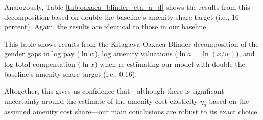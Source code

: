 Analogously, Table \ref{tab:oaxaca_blinder_eta_a_d} shows the results from this decomposition based on double the baseline's amenity share target (i.e., $16$ percent). Again, the results are identical to those in our baseline.
%
\newline\indent
%
\begin{table}[htbp!]
    \caption{Kitagawa-Oaxaca-Blinder decompositions---double baseline's amenity share target}
    \label{tab:oaxaca_blinder_eta_a_d}
    \resizebox{\textwidth}{!}{%
    
    }
    \begin{tablenotes}
        \footnotesize
        This table shows results from the Kitagawa-Oaxaca-Blinder decomposition of the gender gaps in log pay ($\ln w$), log amenity valuations ($\ln \tilde{a} = \ln(x/w)$), and log total compensation ($\ln x$) when re-estimating our model with double the baseline's amenity share target (i.e., $0.16$). %
    \end{tablenotes}
    \begin{tablenotes}[Source]
        \sourcemodel%
    \end{tablenotes}
\end{table}
%

Altogether, this gives us confidence that---although there is significant uncertainty around the estimate of the amenity cost elasticity $\eta_{a}$ based on the assumed amenity cost share---our main conclusions are robust to its exact choice.
